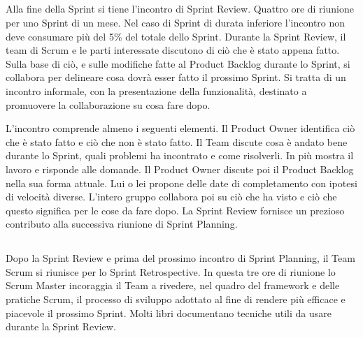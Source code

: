 
\subsection*{\color{Blue}{SPRINT REVIEW}}
\label{sec:sprintreview}
Alla fine della Sprint si tiene l'incontro di Sprint Review. Quattro ore di riunione per uno Sprint di un mese. Nel
caso di Sprint di durata inferiore l'incontro non deve consumare pi\`u del 5\% del totale dello Sprint. Durante la Sprint Review, il
team di Scrum e le parti interessate discutono di ci\`o che \`e stato appena fatto. Sulla base di ci\`o, e sulle modifiche fatte al Product Backlog durante lo Sprint, si collabora per delineare cosa dovr\`a esser fatto il prossimo Sprint. Si
tratta di un incontro informale, con la presentazione della funzionalit\`a, destinato a promuovere la collaborazione su
cosa fare dopo. 
\newline

L'incontro comprende almeno i seguenti elementi. Il Product Owner identifica ci\`o che \`e stato fatto e ci\`o che non
\`e stato fatto. Il Team discute cosa \`e andato bene durante lo Sprint, quali problemi ha incontrato e come
risolverli. In pi\`u mostra il lavoro e risponde alle domande. Il Product Owner discute poi il Product
Backlog nella sua forma attuale. Lui o lei propone delle date di completamento con ipotesi di velocit\`a diverse.
L'intero gruppo collabora poi su ci\`o che ha visto e ci\`o che questo significa per le cose da fare dopo. La Sprint
Review fornisce un prezioso contributo alla successiva riunione di Sprint Planning.

\subsection*{\color{Blue}{SPRINT RETROSPECTIVE}}
\label{sec:sprintretrospective}
Dopo la Sprint Review e prima del prossimo incontro di Sprint Planning, il Team Scrum si riunisce per lo Sprint
Retrospective. In questa tre ore di riunione lo Scrum Master incoraggia il Team a rivedere, nel quadro del framework e
delle pratiche Scrum, il processo di sviluppo adottato al fine di rendere pi\`u efficace e piacevole il prossimo Sprint.
Molti libri documentano tecniche utili da usare durante la Sprint Review.
\newline

